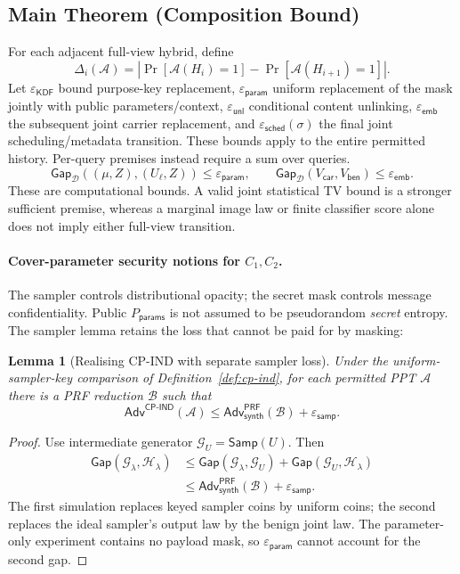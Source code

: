 \documentclass[pdflatex,sn-mathphys-num]{sn-jnl}%
\newtheorem{lemma}{Lemma}
\theoremstyle{definition}
\theoremstyle{game}
\theoremstyle{thmstyleone}%
\theoremstyle{thmstyletwo}%
\theoremstyle{thmstylethree}%
\begin{document}
\subsection{Main Theorem (Composition Bound)}\label{subsec:main-theorem}
For each adjacent full-view hybrid, define
\[
\Delta_i(\mathcal A)=|\Pr[\mathcal A(H_i)=1]-\Pr[\mathcal A(H_{i+1})=1]|.
\]
Let $\varepsilon_{\mathsf{KDF}}$ bound purpose-key replacement,
$\varepsilon_{\mathsf{param}}$ uniform replacement of the mask jointly with
public parameters/context, $\varepsilon_{\mathsf{unl}}$ conditional content
unlinking, $\varepsilon_{\mathsf{emb}}$ the subsequent joint carrier
replacement, and $\varepsilon_{\mathsf{sched}}(\sigma)$ the final joint
scheduling/metadata transition. These bounds apply to the entire permitted
history. Per-query premises instead require a sum over queries.
\[
\mathsf{Gap}_{\mathcal D}((\mu,Z),(U_\ell,Z))\le\varepsilon_{\mathsf{param}},
\qquad
\mathsf{Gap}_{\mathcal D}(V_{\mathsf{car}},V_{\mathsf{ben}})
\le\varepsilon_{\mathsf{emb}}.
\]
These are computational bounds. A valid joint statistical TV bound is a
stronger sufficient premise, whereas a marginal image law or finite
classifier score alone does not imply either full-view transition.

\paragraph{Cover-parameter security notions for $C_1,C_2$.}
The sampler controls distributional opacity; the secret mask controls
message confidentiality. Public $P_{\mathsf{params}}$ is not assumed to be
pseudorandom \emph{secret} entropy. The sampler lemma retains the loss that
cannot be paid for by masking:
\begin{lemma}[Realising CP-IND with separate sampler loss]\label{lem:cpind}
Under the uniform-sampler-key comparison of Definition~\ref{def:cp-ind},
for each permitted PPT $\mathcal A$ there is a PRF reduction $\mathcal B$
such that
\begin{equation}\label{eq:cpind-sampler-bound}
\mathsf{Adv}^{\mathsf{CP\text{-}IND}}(\mathcal A)
\le\mathsf{Adv}^{\mathsf{PRF}}_{\mathsf{synth}}(\mathcal B)
+\varepsilon_{\mathsf{samp}}.
\end{equation}
\end{lemma}
\begin{proof}
Use intermediate generator $\mathcal G_U=\mathsf{Samp}(U)$. Then
\[
\begin{aligned}
\mathsf{Gap}(\mathcal G_\lambda,\mathcal H_\lambda)
&\le\mathsf{Gap}(\mathcal G_\lambda,\mathcal G_U)
+\mathsf{Gap}(\mathcal G_U,\mathcal H_\lambda)\\
&\le\mathsf{Adv}^{\mathsf{PRF}}_{\mathsf{synth}}(\mathcal B)
+\varepsilon_{\mathsf{samp}}.
\end{aligned}
\]
The first simulation replaces keyed sampler coins by uniform coins; the
second replaces the ideal sampler's output law by the benign joint law.
The parameter-only experiment contains no payload mask, so
$\varepsilon_{\mathsf{param}}$ cannot account for the second gap.
\end{proof}
\end{document}
